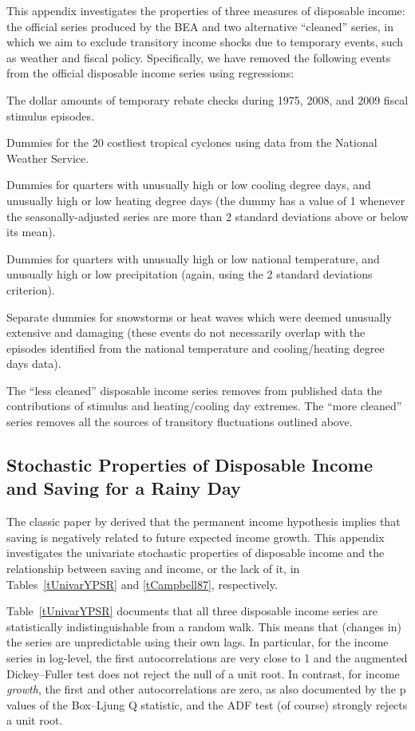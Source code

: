 \documentclass[titlepage]{\econtex}
\begin{document}
This appendix investigates the properties of three measures of disposable income: the official series produced by the BEA and two alternative ``cleaned'' series, in which we aim to exclude transitory income shocks due to temporary events, such as weather and fiscal policy. Specifically, we have removed the following events from the official disposable income series using regressions:
\bi
\item The dollar amounts of temporary rebate checks during 1975, 2008, and 2009 fiscal stimulus episodes.
\item Dummies for the 20 costliest tropical cyclones using data from the National Weather Service.
\item Dummies for quarters with unusually high or low cooling degree days, and unusually high or low heating degree days (the dummy has a value of 1 whenever the seasonally-adjusted series are more than 2 standard deviations above or below its mean).
\item Dummies for quarters with unusually high or low national temperature, and unusually high or low precipitation (again, using the 2 standard deviations criterion).
\item Separate dummies for snowstorms or heat waves which were deemed unusually extensive and damaging (these events do not necessarily overlap with the episodes identified from the national temperature and cooling/heating degree days data).
\ei

The ``less cleaned'' disposable income series removes from published data the contributions of stimulus and heating/cooling day extremes. The ``more cleaned'' series removes all the sources of transitory fluctuations outlined above.



\subsection*{Stochastic Properties of Disposable Income and Saving for a Rainy Day}

The classic paper by \cite{cam87} derived that the permanent income hypothesis implies that saving is negatively  related to future expected income growth.  This appendix investigates the univariate stochastic properties of disposable income and the relationship between saving and income, or the lack of it, in Tables~\ref{tUnivarYPSR} and \ref{tCampbell87}, respectively.

Table~\ref{tUnivarYPSR} documents that all three disposable income series are statistically indistinguishable from a random walk. This means that (changes in) the series are unpredictable using their own lags. In particular, for the income series in log-level, the first autocorrelations are very close to 1 and the augmented Dickey--Fuller test does not reject the null of a unit root. In contrast, for income \emph{growth}, the first and other autocorrelations are zero, as also documented by the p values of the Box--Ljung Q statistic, and the ADF test (of course) strongly rejects  a unit root.
\end{document}
